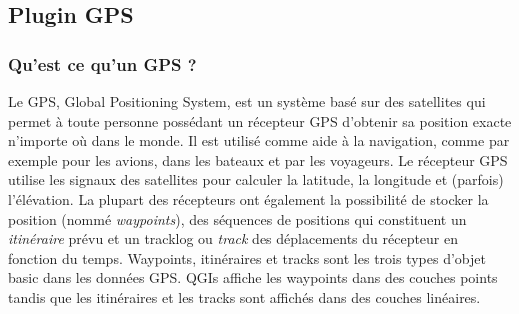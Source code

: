 
\subsection{Plugin GPS}\label{label_plugingps}


\subsubsection{Qu'est ce qu'un GPS ?}\label{whatsgps}

Le GPS, Global Positioning System, est un syst\`eme bas\'e sur des satellites qui
permet \`a toute personne poss\'edant un r\'ecepteur GPS d'obtenir sa position exacte
n'importe o\`u dans le monde. Il est utilis\'e comme aide \`a la navigation, comme par
exemple pour les avions, dans les bateaux et par les voyageurs.
Le r\'ecepteur GPS utilise les signaux des satellites pour calculer la latitude,
la longitude et (parfois) l'\'el\'evation.
La plupart des r\'ecepteurs ont \'egalement la possibilit\'e de stocker la position
(nomm\'e \emph{waypoints}), des s\'equences de positions qui constituent un
\emph{itin\'eraire} pr\'evu et un tracklog ou \emph{track} des d\'eplacements du
r\'ecepteur en fonction du temps.
Waypoints, itin\'eraires et tracks sont les trois types d'objet basic dans les
donn\'ees GPS. QGIs affiche les waypoints dans des couches points tandis que les
itin\'eraires et les tracks sont affich\'es dans des couches lin\'eaires.

